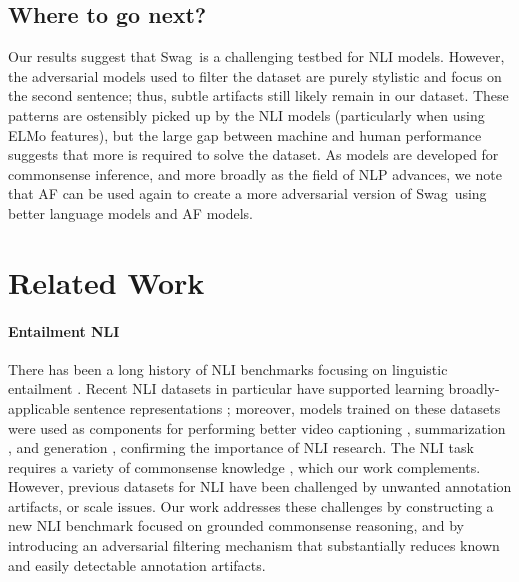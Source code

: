 \documentclass[11pt,a4paper]{article}
\newcommand\customfont[1]{{\usefont{T1}{perm}{m}{n}#1}}
\newcommand{\datasetname}{{\small\customfont{Swag}}}
\begin{document}
\subsection{Where to go next?}
Our results suggest that \datasetname~is a challenging testbed for NLI models. However, the adversarial models used to filter the dataset are purely stylistic and focus on the second sentence; thus, subtle artifacts still likely remain in our dataset. These patterns are ostensibly picked up by the NLI models (particularly when using ELMo features), but the large gap between machine and human performance suggests that more is required to solve the dataset. As models are developed for commonsense inference, and more broadly as the field of NLP advances, we note that AF can be used again to create a more adversarial version of \datasetname~using better language models and AF models.















 
\section{Related Work}
\paragraph{Entailment NLI} 
There has been a long history of NLI benchmarks focusing on linguistic entailment \cite{cooper1996framework, dagan2006pascal, marelli2014sick,bowman2015snli, Lai:2017, williams17multisnli}. 
Recent NLI datasets in particular have supported learning broadly-applicable sentence representations \cite{conneau2017supervised}; moreover, models trained on these datasets were used as components for performing better 
video captioning \cite{pasunuru2017multitask}, summarization \cite{pasunuru_multireward_2018}, and generation \cite{holtzman2018learning}, confirming the importance of NLI research. 
The NLI task requires a variety of commonsense knowledge \cite{lobue2011types}, which our work complements. However, previous datasets for NLI have been challenged by unwanted annotation artifacts, \cite{gururangan2018annotation,poliak_hypothesis_2018} or scale issues. Our work addresses these challenges by constructing a new NLI benchmark focused on grounded commonsense reasoning, and by introducing an adversarial filtering mechanism that substantially reduces known and easily detectable annotation artifacts.
\end{document}
